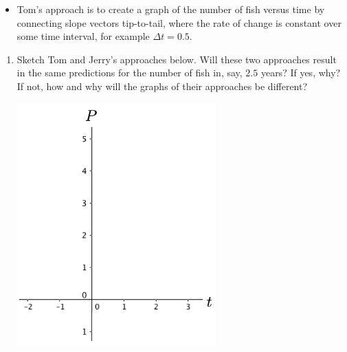 \begin{itemize}
\item	Tom's approach is to create a graph of the number of fish versus time by connecting slope vectors tip-to-tail, where the rate of change is constant over some time interval, for example $\Delta t=0.5$. 

\end{itemize}
\begin{enumerate}

\item Sketch Tom and Jerry's approaches below. Will these two approaches result in the same predictions for the number of fish in, say, $2.5$ years? If yes, why? If not, how and why will the graphs of their approaches be different?\label{05problem1}
\begin{center}
\includegraphics[width=3in]{05/05TomJerry.png}
\end{center}
\end{enumerate}
\clearpage


